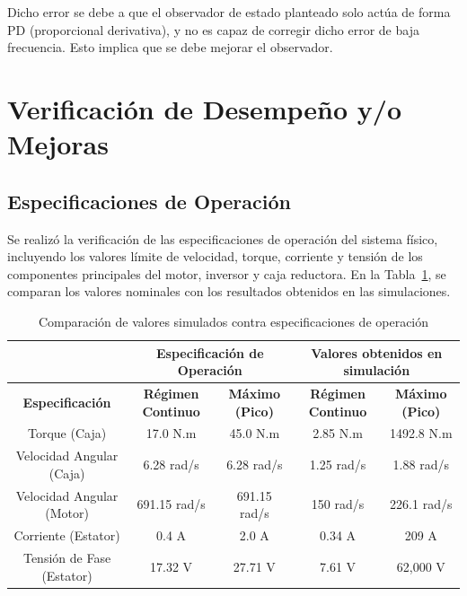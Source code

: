 \documentclass{article}
\begin{document}
Dicho error se debe a que el observador de estado planteado solo actúa de forma PD (proporcional derivativa), y no es capaz
de corregir dicho error de baja frecuencia. Esto implica que se debe mejorar el observador.

\section{Verificación de Desempeño y/o Mejoras}

\subsection{Especificaciones de Operación}
\label{sec:mejora_consignas_velocidades_trapezoidales}

Se realizó la verificación de las especificaciones de operación del sistema físico, incluyendo los valores límite de velocidad, torque, corriente y tensión de los componentes principales del motor, inversor y caja reductora. En la Tabla~\ref{tab:specifications}, se comparan los valores nominales con los resultados obtenidos en las simulaciones.

\begin{table}[H]
    \centering
    \caption{Comparación de valores simulados contra especificaciones de operación}
    \label{tab:specifications}
    \begin{tabular}{|c|c|c|c|c|}
        \hline
         & \multicolumn{2}{|c|}{\textbf{Especificación de Operación}} & \multicolumn{2}{|c|}{\textbf{Valores obtenidos en simulación}} \\ \hline
        \textbf{Especificación} & \textbf{Régimen Continuo} & \textbf{Máximo (Pico)} & \textbf{Régimen Continuo} & \textbf{Máximo (Pico)} \\ \hline
        Torque (Caja) & 17.0 N.m & 45.0 N.m & 2.85 N.m & 1492.8 N.m \\ \hline
        Velocidad Angular (Caja) & 6.28 rad/s & 6.28 rad/s & 1.25 rad/s & 1.88 rad/s \\ \hline
        Velocidad Angular (Motor) & 691.15 rad/s & 691.15 rad/s & 150 rad/s & 226.1 rad/s \\ \hline
        Corriente (Estator) & 0.4 A & 2.0 A & 0.34 A & 209 A \\ \hline
        Tensión de Fase (Estator) & 17.32 V & 27.71 V & 7.61 V & 62,000 V \\ \hline
    \end{tabular}
\end{table}
\end{document}
